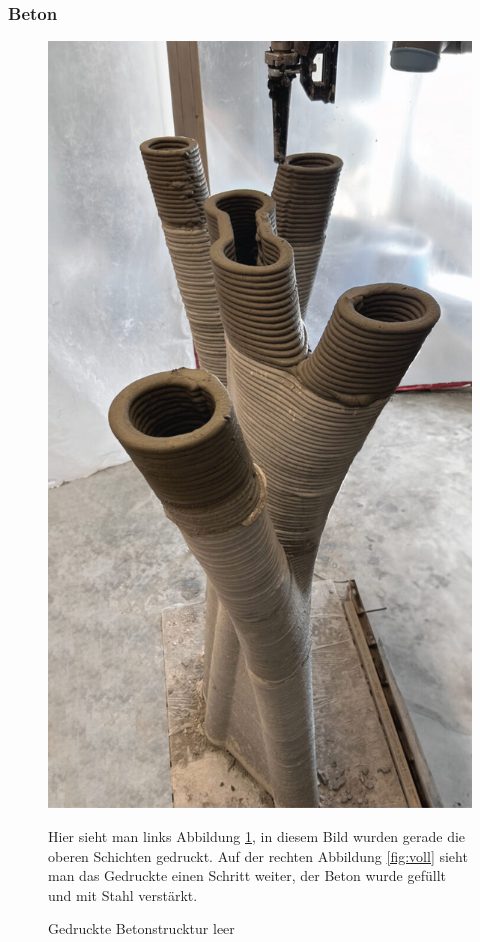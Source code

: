\documentclass{article}
\begin{document}
    \subsubsection{Beton}
    \begin{figure}[H]
        \centering
        \begin{minipage}{0.25\textwidth}
           \centering
           \includegraphics[width=\linewidth]{figures/beispiele/meibodi-2023-1.jpg}
           \caption{Gedruckte Betonstrucktur leer \parencite{meibodi2023}}
           \label{fig:leer}
        \end{minipage}
        \begin{minipage}{0.4\textwidth}
            Hier sieht man links Abbildung \ref{fig:leer}, in diesem Bild wurden gerade die oberen Schichten gedruckt.
            Auf der rechten Abbildung \ref{fig:voll} sieht man das
            Gedruckte einen Schritt weiter, der Beton wurde gef\"ullt und mit Stahl verst\"arkt.


\end{minipage}
\end{figure}
\end{document}
